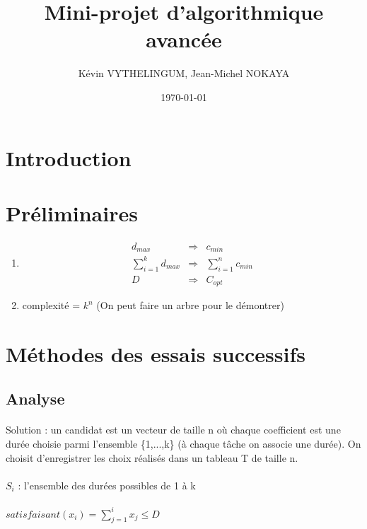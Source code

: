 \documentclass[a4paper, titlepage]{article}
\title{Mini-projet d'algorithmique avancée}      %
\author{Kévin VYTHELINGUM, Jean-Michel NOKAYA}           %
\date{\today}           %
\begin{document}
\maketitle
\tableofcontents
\newpage
\large

\section{Introduction}

\section{Préliminaires}

\begin{enumerate}
\item
	\begin{eqnarray*}
	d_{max} & \Rightarrow & c_{min} \\
	\sum_{i=1}^{k} d_{max} & \Rightarrow & \sum_{i=1}^{n} c_{min} \\
	D & \Rightarrow & C_{opt}
	\end{eqnarray*}
\item
	complexité = $k^{n}$ (On peut faire un arbre pour le démontrer)

\end{enumerate}

\section{Méthodes des essais successifs}

	\subsection{Analyse}

		\paragraph{} \noindent
		Solution : un candidat est un vecteur de taille n où chaque coefficient est une durée choisie parmi l'ensemble \{1,...,k\} (à chaque tâche on associe une durée).
		On choisit d'enregistrer les choix réalisés dans un tableau T de taille n.

		\paragraph{}\noindent
		$S_{i}$ : l'ensemble des durées possibles de 1 à k

		\paragraph{}\noindent
		$satisfaisant(x_{i}) = \sum_{j=1}^{i} x_{j} \le D$
\end{document}
